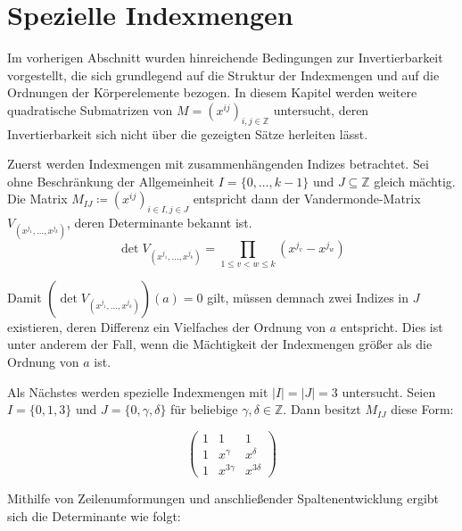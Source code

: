 \section{Spezielle Indexmengen} \label{sec:spezielleIndexmengen}

Im vorherigen Abschnitt wurden hinreichende Bedingungen zur Invertierbarkeit vorgestellt, die sich grundlegend auf die Struktur der Indexmengen und auf die Ordnungen der Körperelemente bezogen. In diesem Kapitel werden weitere quadratische Submatrizen von $M = \left( x^{ij} \right)_{i,j \in \mathbb{Z}}$ untersucht, deren Invertierbarkeit sich nicht über die gezeigten Sätze herleiten lässt.

Zuerst werden Indexmengen mit zusammenhängenden Indizes betrachtet. Sei ohne Beschränkung der Allgemeinheit $I = \{0,\dots,k-1\}$ und $J \subseteq \mathbb{Z}$ gleich mächtig. Die Matrix $M_{IJ} \coloneqq \left( x^{ij} \right)_{i \in I,j \in J}$ entspricht dann der Vandermonde-Matrix $V_{(x^{j_1},\dots,x^{j_k})}$, deren Determinante bekannt ist. \cite{VandermondeDet}
\begin{equation*}
    \det V_{(x^{j_1},\dots,x^{j_k})} = \prod_{1\leq v<w\leq k} (x^{j_v} - x^{j_w})
\end{equation*}

Damit $(\det V_{(x^{j_1},\dots,x^{j_k})})(a) = 0$ gilt, müssen demnach zwei Indizes in $J$ existieren, deren Differenz ein Vielfaches der Ordnung von $a$ entspricht. Dies ist unter anderem der Fall, wenn die Mächtigkeit der Indexmengen größer als die Ordnung von $a$ ist.

\begin{sloppypar}
    Als Nächstes werden spezielle Indexmengen mit $|I| = |J| = 3$ untersucht. Seien ${I = \{0, 1, 3\}}$ und $J = \{0, \gamma, \delta\}$ für beliebige $\gamma,\delta \in \mathbb{Z}$. Dann besitzt $M_{IJ}$ diese Form:
\end{sloppypar}
\begin{equation*}
    \begin{pmatrix}
        1 & 1 & 1 \\
        1 & x^{\gamma} & x^{\delta} \\
        1 & x^{3\gamma} & x^{3\delta}
    \end{pmatrix}
\end{equation*}

Mithilfe von Zeilenumformungen und anschließender Spaltenentwicklung ergibt sich die Determinante wie folgt:

